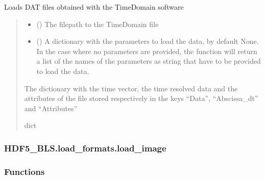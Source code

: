 \documentclass[letterpaper,10pt,english]{sphinxmanual}
\begin{document}
\begin{fulllineitems}
\label{\detokenize{_autosummary/HDF5_BLS.load_formats.load_dat:HDF5_BLS.load_formats.load_dat.load_dat_TimeDomain}}
\pysigstartsignatures
\pysiglinewithargsret
{}
{\sphinxparamcomma {}}
{}
\pysigstopsignatures
\sphinxAtStartPar
Loads DAT files obtained with the TimeDomain software
\begin{quote}\begin{description}
\begin{itemize}
\item {} 
\sphinxAtStartPar
{} () \textendash{} The filepath to the TimeDomain file

\item {} 
\sphinxAtStartPar
{} (\sphinxstyleliteralemphasis{\sphinxupquote{, }}) \textendash{} A dictionary with the parameters to load the data, by default None. In the case where no parameters are provided, the function will return a list of the names of the parameters as string that have to be provided to load the data.

\end{itemize}

\sphinxAtStartPar
The dictionary with the time vector, the time resolved data and the attributes of the file stored respectively in the keys “Data”, “Abscissa\_dt” and “Attributes”

\sphinxAtStartPar
dict

\end{description}\end{quote}

\end{fulllineitems}


\sphinxstepscope


\subsubsection{HDF5\_BLS.load\_formats.load\_image}
\label{\detokenize{_autosummary/HDF5_BLS.load_formats.load_image:module-HDF5_BLS.load_formats.load_image}}\label{\detokenize{_autosummary/HDF5_BLS.load_formats.load_image:hdf5-bls-load-formats-load-image}}\label{\detokenize{_autosummary/HDF5_BLS.load_formats.load_image::doc}}\subsubsection*{Functions}
\end{document}
